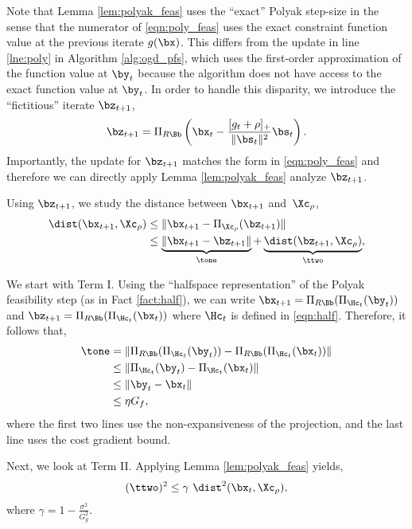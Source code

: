 Note that Lemma \ref{lem:polyak_feas} uses the ``exact'' Polyak step-size in the sense that the numerator of \eqref{eqn:poly_feas} uses the exact constraint function value at the previous iterate $g(\bx)$.
This differs from the update in line \ref{lne:poly} in Algorithm \ref{alg:ogd_pfs}, which uses the first-order approximation of the function value at $\by_t$ because the algorithm does not have access to the exact function value at $\by_t$.
In order to handle this disparity, we introduce the ``fictitious'' iterate $\bz_{t+1}$,
\begin{equation*}
    \bz_{t+1} = \Pi_{R \Bb} \left(\bx_t - \frac{[g_t + \rho]_+}{\| \bs_t \|^2} \bs_t \right).
\end{equation*}
Importantly, the update for $\bz_{t+1}$ matches the form in \eqref{eqn:poly_feas} and therefore we can directly apply Lemma \ref{lem:polyak_feas} analyze $\bz_{t+1}$.

Using $\bz_{t+1}$, we study the distance between $\bx_{t+1}$ and~$\Xc_\rho$,
\begin{align*}
    \dist(\bx_{t+1}, \Xc_\rho) & \leq \| \bx_{t+1} - \Pi_{\Xc_\rho}(\bz_{t+1}) \|\\
    & \leq \underbrace{\| \bx_{t+1} - \bz_{t+1} \|}_{\tone} + \underbrace{\dist(\bz_{t+1}, \Xc_\rho)}_{\ttwo},
\end{align*}

We start with Term I.
Using the ``halfspace representation'' of the Polyak feasibility step (as in Fact \ref{fact:half}), we can write $\bx_{t+1} = \Pi_{R \Bb}(\Pi_{\Hc_t} (\by_t))$ and $\bz_{t+1} = \Pi_{R \Bb}(\Pi_{\Hc_t} (\bx_t))$ where $\Hc_t$ is defined in \eqref{eqn:half}.
Therefore, it follows that,
\begin{align*}
    \tone & = \| \Pi_{R \Bb}(\Pi_{\Hc_t} (\by_t)) - \Pi_{R \Bb}(\Pi_{\Hc_t} (\bx_t)) \|\\
    & \leq \| \Pi_{\Hc_t} (\by_t) - \Pi_{\Hc_t} (\bx_t) \|\\
    & \leq \| \by_t - \bx_t \| \\
    & \leq \eta G_f,
\end{align*}
where the first two lines use the non-expansiveness of the projection, and the last line uses the cost gradient bound. 

Next, we look at Term II.
Applying Lemma \ref{lem:polyak_feas} yields,
\begin{align*}
    (\ttwo)^2 \leq \gamma\ \dist^2(\bx_t, \Xc_\rho),
\end{align*}
where $\gamma = 1 - \frac{\sigma^2}{G_g^2}$.

